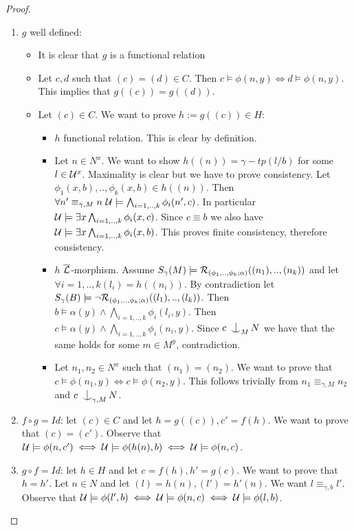 \documentclass[../main.tex]{subfiles}
\begin{document}
\begin{proof}
\begin{enumerate}
\begin{itemize}
\begin{itemize}
					\end{itemize}
			\end{itemize}
		\item	$g$ well defined:
			\begin{itemize}
				\item	It is clear that $g$ is a functional relation
				\item	Let $c,d$ such that $(c) = (d) \in C$. Then $c \models \phi(n,y) \iff d \models \phi(n,y)$.
					This implies that $g((c)) = g((d))$.
				\item	Let $(c) \in C$. We want to prove $h := g((c)) \in H$:
					\begin{itemize}
						\item	$h$ functional relation. This is clear by definition.
						\item	Let $n \in N^x$. We want to show $h((n)) = \gamma-tp(l/b)$ for some $l \in \mathcal{U}^x$. 
							Maximality is clear but we have to prove consistency.
							Let $\phi_1(x,b),..,\phi_k(x,b) \in h((n))$. 
							Then $\forall n' \equiv_{\gamma,M} n \ \mathcal{U} \models \bigwedge_{i=1,..,k} \phi_i(n',c)$.
							In particular $\mathcal{U} \models \exists x \bigwedge_{i=1,..,k} \phi_i(x,c)$.
							Since $c \equiv b$ we also have $\mathcal{U} \models \exists x \bigwedge_{i=1,..,k} \phi_i(x,b)$.
							This proves finite consistency, therefore consistency.
						\item	$h$ $\overline{\mathcal{L}}$-morphism.
							Assume $S_{\gamma}(M) \models \mathcal{R}_{(\phi_1,..,\phi_k; \alpha)}((n_1),..,(n_k))$ and let $\forall i = 1,..,k (l_i) = h((n_i))$.
							By contradiction let $S_{\gamma}(B) \models \neg \mathcal{R}_{(\phi_1,..,\phi_k;\alpha)}((l_1),..,(l_k))$.
							Then $b \models \alpha(y) \land \bigwedge_{i = 1,..,k} \phi_i(l_i,y)$.
							Then $c \models \alpha(y) \land \bigwedge_{i = 1,..,k} \phi_i(n_i,y)$.
							Since $c \nonfork_M N$ we have that the same holds for some $m \in M^y$, contradiction.
						\item	Let $n_1,n_2 \in N^x$ such that $(n_1) = (n_2)$. We want to prove that $c \models \phi(n_1,y) \iff c \models \phi(n_2,y)$.
							This follows trivially from $n_1 \equiv_{\gamma,M} n_2$ and $c \nonfork_{\gamma,M} N$.
					\end{itemize}
			\end{itemize}

		\item	$f \circ g = Id$: let $(c) \in C$ and let $h = g((c)), c' = f(h)$. We want to prove that $(c) = (c')$.
			Observe that $\mathcal{U} \models \phi(n,c') \iff \mathcal{U} \models \phi(h(n),b) \iff \mathcal{U} \models \phi(n,c)$.

		\item	$g \circ f = Id$: let $h \in H$ and let $c = f(h), h' = g(c)$. We want to prove that $h = h'$.
			Let $n \in N$ and let $(l) = h(n), (l') = h'(n)$. We want $l \equiv_{\gamma,b} l'$.
			Observe that $\mathcal{U} \models \phi(l',b) \iff \mathcal{U} \models \phi(n,c) \iff \mathcal{U} \models \phi(l,b)$.

	\end{enumerate}
\end{proof}
\end{document}
